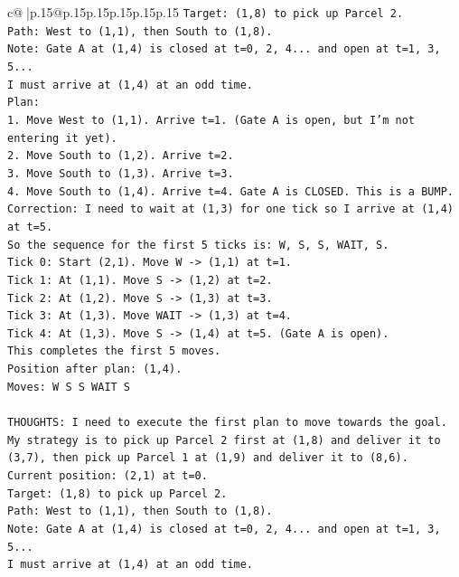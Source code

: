 \documentclass{article}
\begin{document}
{\begin{supertabular}{c@{$\;$}|p{.15\linewidth}@{}p{.15\linewidth}p{.15\linewidth}p{.15\linewidth}p{.15\linewidth}p{.15\linewidth}}
{{{\texttt{Target: (1,8) to pick up Parcel 2.} \\
\texttt{Path: West to (1,1), then South to (1,8).} \\
\texttt{Note: Gate A at (1,4) is closed at t=0, 2, 4... and open at t=1, 3, 5...} \\
\texttt{I must arrive at (1,4) at an odd time.} \\
\texttt{Plan:} \\
\texttt{1. Move West to (1,1). Arrive t=1. (Gate A is open, but I'm not entering it yet).} \\
\texttt{2. Move South to (1,2). Arrive t=2.} \\
\texttt{3. Move South to (1,3). Arrive t=3.} \\
\texttt{4. Move South to (1,4). Arrive t=4. Gate A is CLOSED. This is a BUMP.} \\
\texttt{Correction: I need to wait at (1,3) for one tick so I arrive at (1,4) at t=5.} \\
\texttt{So the sequence for the first 5 ticks is: W, S, S, WAIT, S.} \\
\texttt{Tick 0: Start (2,1). Move W {-}> (1,1) at t=1.} \\
\texttt{Tick 1: At (1,1). Move S {-}> (1,2) at t=2.} \\
\texttt{Tick 2: At (1,2). Move S {-}> (1,3) at t=3.} \\
\texttt{Tick 3: At (1,3). Move WAIT {-}> (1,3) at t=4.} \\
\texttt{Tick 4: At (1,3). Move S {-}> (1,4) at t=5. (Gate A is open).} \\
\texttt{This completes the first 5 moves.} \\
\texttt{Position after plan: (1,4).} \\
\texttt{Moves: W S S WAIT S} \\
\\ 
\texttt{THOUGHTS: I need to execute the first plan to move towards the goal. My strategy is to pick up Parcel 2 first at (1,8) and deliver it to (3,7), then pick up Parcel 1 at (1,9) and deliver it to (8,6).} \\
\texttt{Current position: (2,1) at t=0.} \\
\texttt{Target: (1,8) to pick up Parcel 2.} \\
\texttt{Path: West to (1,1), then South to (1,8).} \\
\texttt{Note: Gate A at (1,4) is closed at t=0, 2, 4... and open at t=1, 3, 5...} \\
\texttt{I must arrive at (1,4) at an odd time.} \\
}}}
\end{supertabular}}
\end{document}
